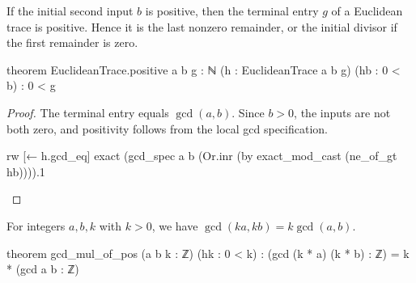 \begin{corollary}
  \label{ent:thm:euclidean-positive}
  If the initial second input $b$ is positive, then the terminal entry $g$ of a Euclidean trace is
  positive.
  Hence it is the last nonzero remainder, or the initial divisor if the first remainder is zero.

  \begin{lean}
    theorem EuclideanTrace.positive {a b g : ℕ} (h : EuclideanTrace a b g)
        (hb : 0 < b) : 0 < g
  \end{lean}
\end{corollary}

\begin{proof}

  The terminal entry equals $\gcd(a,b)$.
  Since $b>0$, the inputs are not both zero, and positivity follows from the local gcd
  specification.

  \begin{lean}
    rw [← h.gcd_eq]
    exact (gcd_spec a b (Or.inr (by exact_mod_cast (ne_of_gt hb)))).1
  \end{lean}

\end{proof}

\begin{theorem}
  \label{ent:thm:gcd-positive-factor}
  For integers $a,b,k$ with $k>0$, we have $\gcd(ka,kb)=k\gcd(a,b)$.

  \begin{lean}
    theorem gcd_mul_of_pos (a b k : ℤ) (hk : 0 < k) :
        (gcd (k * a) (k * b) : ℤ) = k * (gcd a b : ℤ)
  \end{lean}
\end{theorem}

